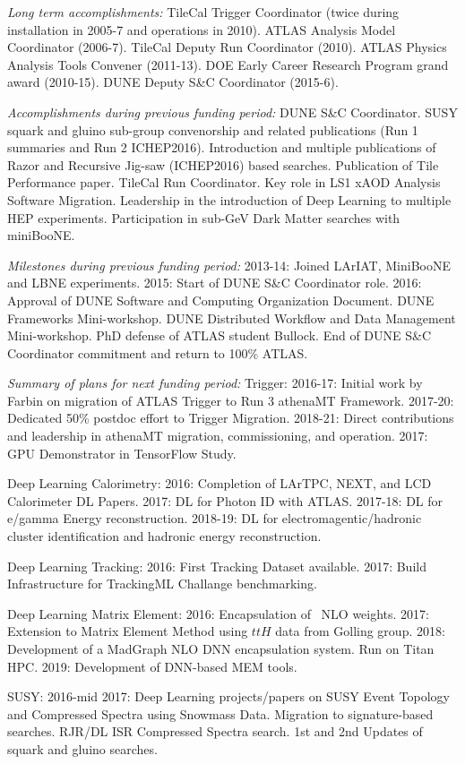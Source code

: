 
{\em Long term accomplishments:} TileCal Trigger Coordinator (twice during
installation in 2005-7 and operations in 2010). ATLAS Analysis Model
Coordinator (2006-7). TileCal Deputy Run Coordinator (2010). ATLAS
Physics Analysis Tools Convener (2011-13). DOE Early Career Research
Program grand award (2010-15). DUNE Deputy S\&C Coordinator (2015-6).

{\em Accomplishments during previous funding period:} DUNE S\&C
Coordinator.  SUSY squark and gluino sub-group convenorship and
related publications (Run 1 summaries and Run 2
ICHEP2016). Introduction and multiple publications of Razor and
Recursive Jig-saw (ICHEP2016) based searches. Publication of Tile
Performance paper. TileCal Run Coordinator. Key role in LS1 xAOD
Analysis Software Migration.  Leadership in the introduction of Deep
Learning to multiple HEP experiments. Participation in sub-GeV Dark
Matter searches with miniBooNE.

{\em Milestones during previous funding period:} 2013-14: Joined
LArIAT, MiniBooNE and LBNE experiments. 2015: Start of DUNE S\&C
Coordinator role.  2016: Approval of DUNE Software and Computing
Organization Document. DUNE Frameworks Mini-workshop. DUNE Distributed
Workflow and Data Management Mini-workshop. PhD defense of ATLAS
student Bullock. End of DUNE S\&C Coordinator commitment and return to
100\% ATLAS.

{\em Summary of plans for next funding period:} Trigger: 2016-17:
Initial work by Farbin on migration of ATLAS Trigger to Run 3 athenaMT
Framework.  2017-20: Dedicated 50\% postdoc effort to Trigger
Migration. 2018-21: Direct contributions and leadership in athenaMT
migration, commissioning, and operation.  2017: GPU
Demonstrator in TensorFlow Study.

Deep Learning Calorimetry: 2016: Completion of LArTPC, NEXT, and LCD
Calorimeter DL Papers. 2017: DL for Photon ID with ATLAS. 2017-18: DL
for e/gamma Energy reconstruction. 2018-19: DL for
electromagentic/hadronic cluster identification and hadronic energy
reconstruction.

Deep Learning Tracking: 2016: First Tracking Dataset available. 2017:
Build Infrastructure for TrackingML Challange benchmarking.

Deep Learning Matrix Element: 2016: Encapsulation of \ttbar\ NLO
weights. 2017: Extension to Matrix Element Method using $ttH$ data
from Golling group. 2018: Development of a MadGraph NLO DNN
encapsulation system. Run on Titan HPC. 2019: Development of DNN-based
MEM tools. 

SUSY: 2016-mid 2017: Deep Learning projects/papers on SUSY Event
Topology and Compressed Spectra using Snowmass Data.  Migration to
signature-based searches.  RJR/DL ISR Compressed Spectra search.  1st
and 2nd Updates of squark and gluino searches.


